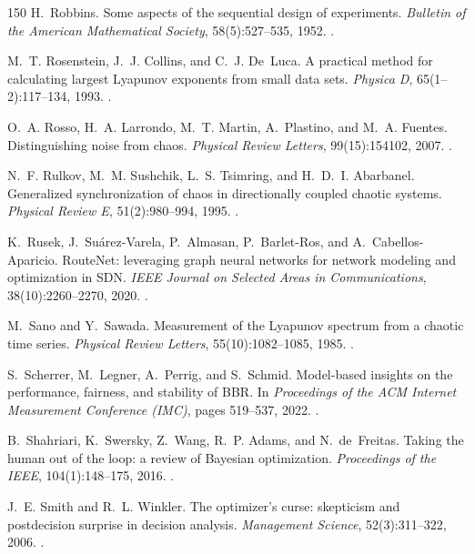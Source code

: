 \begin{thebibliography}{150}
H.~Robbins. Some aspects of the sequential design of experiments. \emph{Bulletin of the American Mathematical Society}, 58(5):527--535, 1952. .

M.~T. Rosenstein, J.~J. Collins, and C.~J. De~Luca. A practical method for calculating largest Lyapunov exponents from small data sets. \emph{Physica D}, 65(1--2):117--134, 1993. .

O.~A. Rosso, H.~A. Larrondo, M.~T. Martin, A.~Plastino, and M.~A. Fuentes. Distinguishing noise from chaos. \emph{Physical Review Letters}, 99(15):154102, 2007. .

N.~F. Rulkov, M.~M. Sushchik, L.~S. Tsimring, and H.~D.~I. Abarbanel. Generalized synchronization of chaos in directionally coupled chaotic systems. \emph{Physical Review E}, 51(2):980--994, 1995. .

K.~Rusek, J.~Su{\'a}rez-Varela, P.~Almasan, P.~Barlet-Ros, and A.~Cabellos-Aparicio. RouteNet: leveraging graph neural networks for network modeling and optimization in SDN. \emph{IEEE Journal on Selected Areas in Communications}, 38(10):2260--2270, 2020. .

M.~Sano and Y.~Sawada. Measurement of the Lyapunov spectrum from a chaotic time series. \emph{Physical Review Letters}, 55(10):1082--1085, 1985. .

S.~Scherrer, M.~Legner, A.~Perrig, and S.~Schmid. Model-based insights on the performance, fairness, and stability of BBR. In \emph{Proceedings of the ACM Internet Measurement Conference (IMC)}, pages 519--537, 2022. .

B.~Shahriari, K.~Swersky, Z.~Wang, R.~P. Adams, and N.~de~Freitas. Taking the human out of the loop: a review of Bayesian optimization. \emph{Proceedings of the IEEE}, 104(1):148--175, 2016. .

J.~E. Smith and R.~L. Winkler. The optimizer's curse: skepticism and postdecision surprise in decision analysis. \emph{Management Science}, 52(3):311--322, 2006. .


\end{thebibliography}
